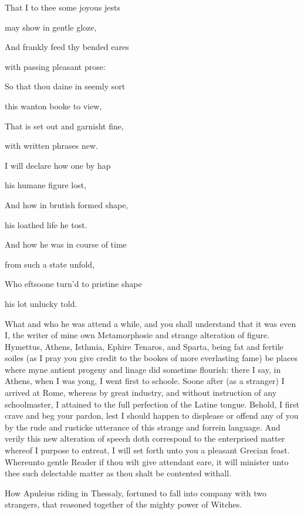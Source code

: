 That I to thee some joyous jests

may show in gentle gloze,

And frankly feed thy bended eares

with passing pleasant prose:

So that thou daine in seemly sort

this wanton booke to view,

That is set out and garnisht fine,

with written phrases new.

I will declare how one by hap

his humane figure lost,

And how in brutish formed shape,

his loathed life he tost.

And how he was in course of time

from such a state unfold,

Who eftsoone turn’d to pristine shape

his lot unlucky told.

What and who he was attend a while, and you shall understand that it was even
I, the writer of mine own Metamorphosie and strange alteration of figure.
Hymettus, Athens, Isthmia, Ephire Tenaros, and Sparta, being fat and fertile
soiles (as I pray you give credit to the bookes of more everlasting fame) be
places where myne antient progeny and linage did sometime flourish: there I
say, in Athens, when I was yong, I went first to schoole. Soone after (as a
stranger) I arrived at Rome, whereas by great industry, and without instruction
of any schoolmaster, I attained to the full perfection of the Latine tongue.
Behold, I first crave and beg your pardon, lest I should happen to displease or
offend any of you by the rude and rusticke utterance of this strange and
forrein language. And verily this new alteration of speech doth correspond to
the enterprised matter whereof I purpose to entreat, I will set forth unto you
a pleasant Grecian feast. Whereunto gentle Reader if thou wilt give attendant
eare, it will minister unto thee such delectable matter as thou shalt be
contented withall.



How Apuleius riding in Thessaly, fortuned to fall into company with two
strangers, that reasoned together of the mighty power of Witches.


